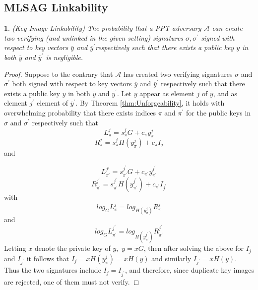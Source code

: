 \documentclass[12pt,oneside,english]{amsart}
\numberwithin{equation}{section}
\numberwithin{figure}{section}
\theoremstyle{plain}
\newtheorem{thm}{\protect\theoremname}
\theoremstyle{plain}
\theoremstyle{remark}
\theoremstyle{plain}
\theoremstyle{remark}
\theoremstyle{remark}
\theoremstyle{plain}
\theoremstyle{definition}
\providecommand{\theoremname}{Theorem}
\begin{document}
\subsection{MLSAG Linkability}
\begin{thm}
(Key-Image Linkability) The probability that a PPT adversary $\mathcal{A}$
can create two verifying (and unlinked in the given setting) signatures $\sigma,\sigma^{\prime}$ signed
with respect to key vectors $\overline{y}$ and $\overline{y}^{\prime}$respectively
such that there exists a public key $y$ in both $\overline{y}$ and
$\overline{y}^{\prime}$ is negligible. \end{thm}
\begin{proof}
Suppose to the contrary that $\mathcal{A}$ has created two verifying
signatures $\sigma$ and $\sigma^{\prime}$ both signed with respect to key
vectors $\overline{y}$ and $\overline{y}^{\prime}$ respectively such
that there exists a public key $y$ in both $\overline{y}$ and $\overline{y}^{\prime}.$
Let $y$ appear as element $j$ of $\overline{y}$,  and as element
$j^{\prime}$ element of $\overline{y}^{\prime}.$ By Theorem \ref{thm:Unforgeability},
it holds with overwhelming probability that there exists indices $\pi$
and $\pi^{\prime}$ for the public keys in $\sigma$ and $\sigma^{\prime}$
respectively such that 
\[
L_{\pi}^{j}=s_{\pi}^{j}G+c_{\pi}y_{\pi}^{j}
\]
\[
R_{\pi}^{j}=s_{\pi}^{j}H\left(y_{\pi}^{j}\right)+c_{\pi}I_{j}
\]
 and 

\[
L_{\pi^{\prime}}^{j\prime}=s_{\pi^{\prime}}^{j^{\prime}}G+c_{\pi^{\prime}}y_{\pi^{\prime}}^{j^{\prime}}
\]
\[
R_{\pi^{\prime}}^{j^{\prime}}=s_{\pi^{\prime}}^{j^{\prime}}H\left(y_{\pi^{\prime}}^{j^{\prime}}\right)+c_{\pi^{\prime}}I_{j^{\prime}}
\]
 with 
\[
log_{G}L_{\pi}^{j}=log_{H\left(y_{\pi}^{j}\right)}R_{\pi}^{j}
\]
 and 
\[
log_{G}L_{\pi^{\prime}}^{j^{\prime}}=log_{H\left(y_{\pi^{\prime}}^{j^{\prime}}\right)}R_{\pi^{\prime}}^{j^{\prime}}
\]
Letting $x$ denote the private key of $y,$ $y=xG$, then after solving
the above for $I_{j}$ and $I_{j^{\prime}}$ it follows that $I_{j}=xH\left(y_{\pi}^{j}\right)=xH\left(y\right)$
and similarly $I_{j^{\prime}}=xH\left(y\right).$ Thus the two signatures
include $I_{j}=I_{j^{\prime}}$, and therefore, since duplicate key images are rejected, one of them must not verify. 
\end{proof}
\end{document}
